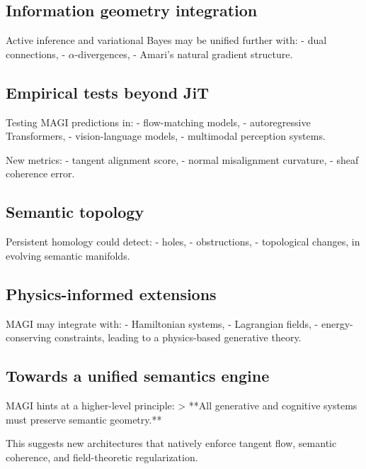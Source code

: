 \documentclass[11pt,a4paper,twocolumn]{article}
\begin{document}
\subsection{Information geometry integration}

Active inference and variational Bayes may be unified further with:
- dual connections,
- $\alpha$-divergences,
- Amari's natural gradient structure.

\subsection{Empirical tests beyond JiT}

Testing MAGI predictions in:
- flow-matching models,
- autoregressive Transformers,
- vision-language models,
- multimodal perception systems.

New metrics:
- tangent alignment score,
- normal misalignment curvature,
- sheaf coherence error.

\subsection{Semantic topology}

Persistent homology could detect:
- holes,
- obstructions,
- topological changes,
in evolving semantic manifolds.

\subsection{Physics-informed extensions}

MAGI may integrate with:
- Hamiltonian systems,
- Lagrangian fields,
- energy-conserving constraints,
leading to a physics-based generative theory.

\subsection{Towards a unified semantics engine}

MAGI hints at a higher-level principle:
> **All generative and cognitive systems must preserve semantic geometry.**

This suggests new architectures that natively enforce tangent flow,
semantic coherence, and field-theoretic regularization.


\end{document}
